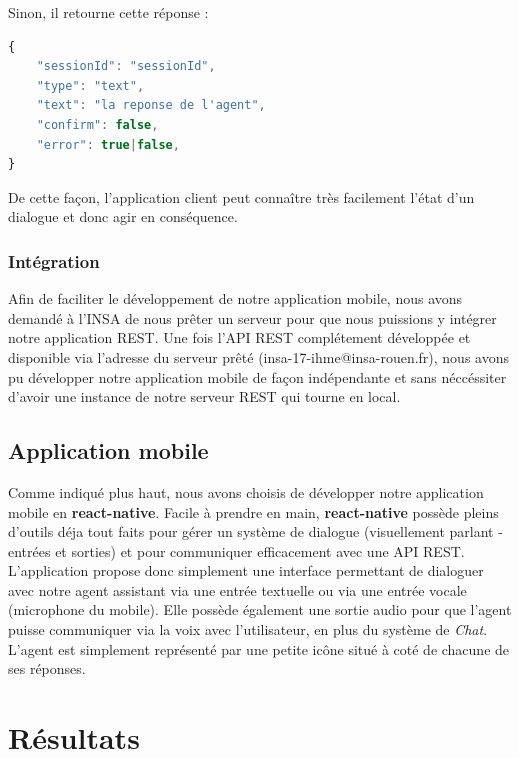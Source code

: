 Sinon, il retourne cette réponse : \\

\begin{lstlisting}[language=Javascript]
{
    "sessionId": "sessionId",
    "type": "text",
    "text": "la reponse de l'agent",
    "confirm": false,
    "error": true|false,
}
\end{lstlisting}

De cette façon, l'application client peut connaître très facilement l'état d'un dialogue et donc agir en conséquence.\\

\subsubsection{Intégration}

Afin de faciliter le développement de notre application mobile, nous avons demandé à l'INSA de nous prêter un serveur pour que nous puissions y intégrer notre 
application REST. Une fois l'API REST complétement développée et disponible via l'adresse du serveur prêté (insa-17-ihme@insa-rouen.fr), nous avons pu développer 
notre application mobile de façon indépendante et sans néccéssiter d'avoir une instance de notre serveur REST qui tourne en local.

\subsection{Application mobile}

Comme indiqué plus haut, nous avons choisis de développer notre application mobile en \textbf{react-native}. Facile à prendre en main, \textbf{react-native} possède 
pleins d'outils déja tout faits pour gérer un système de dialogue (visuellement parlant - entrées et sorties) et pour communiquer efficacement avec une API REST.\\

L'application propose donc simplement une interface permettant de dialoguer avec notre agent assistant via une entrée textuelle ou via une entrée vocale (microphone du mobile).
Elle possède également une sortie audio pour que l'agent puisse communiquer via la voix avec l'utilisateur, en plus du système de \emph{Chat}.\\

L'agent est simplement représenté par une petite icône situé à coté de chacune de ses réponses.

\section{Résultats}

